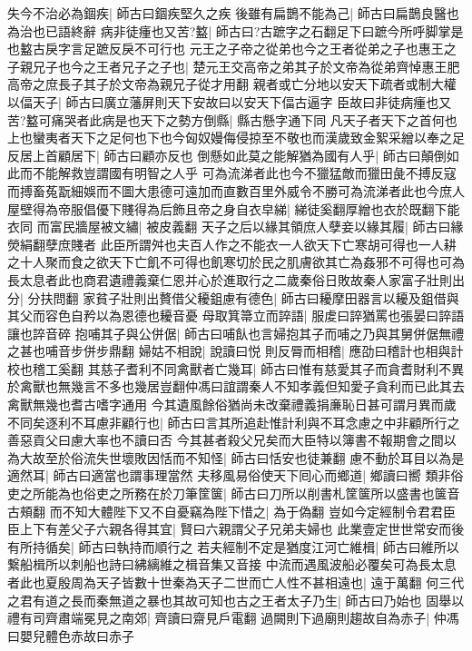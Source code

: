 失今不治必為錮疾|{
	師古曰錮疾堅久之疾}
後雖有扁鵲不能為己|{
	師古曰扁鵲良醫也為治也已語終辭}
病非徒瘇也又苦?盭|{
	師古曰?古蹠字之石翻足下曰蹠今所呼脚掌是也盭古戾字言足蹠反戾不可行也}
元王之子帝之從弟也今之王者從弟之子也惠王之子親兄子也今之王者兄子之子也|{
	楚元王交高帝之弟其子於文帝為從弟齊悼惠王肥高帝之庶長子其子於文帝為親兄子從才用翻}
親者或亡分地以安天下疏者或制大權以偪天子|{
	師古曰廣立藩屏則天下安故曰以安天下偪古逼字}
臣故曰非徒病瘇也又苦?盭可痛哭者此病是也天下之勢方倒縣|{
	縣古懸字通下同}
凡天子者天下之首何也上也蠻夷者天下之足何也下也今匈奴嫚侮侵掠至不敬也而漢歲致金絮采繒以奉之足反居上首顧居下|{
	師古曰顧亦反也}
倒懸如此莫之能解猶為國有人乎|{
	師古曰顛倒如此而不能解救豈謂國有明智之人乎}
可為流涕者此也今不獵猛敵而獵田彘不搏反寇而搏畜菟翫細娛而不圖大患德可遠加而直數百里外威令不勝可為流涕者此也今庶人屋壁得為帝服倡優下賤得為后飾且帝之身自衣皁綈|{
	綈徒奚翻厚繒也衣於既翻下能衣同}
而富民牆屋被文繡|{
	被皮義翻}
天子之后以緣其領庶人孽妾以緣其履|{
	師古曰緣熒絹翻孽庶賤者}
此臣所謂舛也夫百人作之不能衣一人欲天下亡寒胡可得也一人耕之十人聚而食之欲天下亡飢不可得也飢寒切於民之肌膚欲其亡為姦邪不可得也可為長太息者此也商君遺禮義棄仁恩并心於進取行之二歲秦俗日敗故秦人家富子壯則出分|{
	分扶問翻}
家貧子壯則出贅借父耰鉏慮有德色|{
	師古曰耰摩田器言以耰及鉏借與其父而容色自矜以為恩德也耰音憂}
母取箕箒立而誶語|{
	服䖍曰誶猶罵也張晏曰誶語讓也誶音碎}
抱哺其子與公併倨|{
	師古曰哺飤也言婦抱其子而哺之乃與其舅併倨無禮之甚也哺音步併步鼎翻}
婦姑不相說|{
	說讀曰悦}
則反脣而相稽|{
	應劭曰稽計也相與計校也稽工奚翻}
其慈子耆利不同禽獸者亡幾耳|{
	師古曰惟有慈愛其子而貪耆財利不異於禽獸也無幾言不多也幾居豈翻仲馮曰誼謂秦人不知孝義但知愛子貪利而已此其去禽獸無幾也耆古嗜字通用}
今其遺風餘俗猶尚未改棄禮義捐亷恥日甚可謂月異而歲不同矣逐利不耳慮非顧行也|{
	師古曰言其所追赴惟計利與不耳念慮之中非顧所行之善惡貢父曰慮大率也不讀曰否}
今其甚者殺父兄矣而大臣特以簿書不報期會之間以為大故至於俗流失世壞敗因恬而不知怪|{
	師古曰恬安也徒兼翻}
慮不動於耳目以為是適然耳|{
	師古曰適當也謂事理當然}
夫移風易俗使天下囘心而鄉道|{
	鄉讀曰嚮}
類非俗吏之所能為也俗吏之所務在於刀筆筐箧|{
	師古曰刀所以削書札筐箧所以盛書也箧音古頰翻}
而不知大體陛下又不自憂竊為陛下惜之|{
	為于偽翻}
豈如今定經制令君君臣臣上下有差父子六親各得其宜|{
	賢曰六親謂父子兄弟夫婦也}
此業壹定世世常安而後有所持循矣|{
	師古曰執持而順行之}
若夫經制不定是猶度江河亡維楫|{
	師古曰維所以繋船楫所以刺船也詩曰紼縭維之楫音集又音接}
中流而遇風波船必覆矣可為長太息者此也夏殷周為天子皆數十世秦為天子二世而亡人性不甚相遠也|{
	遠于萬翻}
何三代之君有道之長而秦無道之暴也其故可知也古之王者太子乃生|{
	師古曰乃始也}
固舉以禮有司齊肅端冕見之南郊|{
	齊讀曰齋見戶電翻}
過闕則下過廟則趨故自為赤子|{
	仲馮曰嬰兒體色赤故曰赤子}
